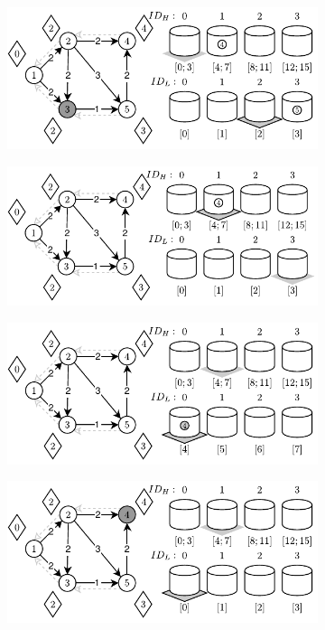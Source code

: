 \begin{figure}[!htbp]
	\ContinuedFloat
	\centering
	\begin{subfigure}[b]{0.45\textwidth}
		\includegraphics[width=\textwidth]{Chapter_II/4/e.pdf}
		\caption{}
	\end{subfigure}%
	\qquad
	\begin{subfigure}[b]{0.45\textwidth}
		\includegraphics[width=\textwidth]{Chapter_II/4/f.pdf}
		\caption{}
	\end{subfigure}
	\begin{subfigure}[b]{0.45\textwidth}
		\includegraphics[width=\textwidth]{Chapter_II/4/g.pdf}
		\caption{}
	\end{subfigure}
	\qquad
	\begin{subfigure}[b]{0.45\textwidth}
		\includegraphics[width=\textwidth]{Chapter_II/4/h.pdf}

\end{subfigure}
\end{figure}
